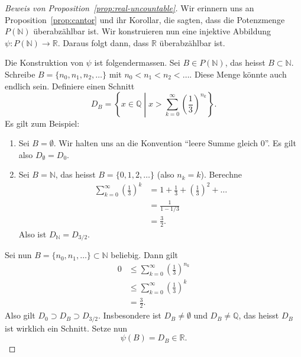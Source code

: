 \documentclass[../main.tex]{subfiles}
\begin{document}
\begin{proof}[Beweis von Proposition~\ref{prop:real-uncountable}]
  Wir erinnern uns an Proposition~\ref{prop:cantor} und ihr Korollar,
  die sagten, dass die Potenzmenge $P(\mathbb N )$ überabzählbar ist.
  Wir konstruieren nun eine injektive Abbildung
  $\psi \colon P(\mathbb N) \to \mathbb R$.
  Daraus folgt dann, dass $\mathbb R$ überabzählbar ist.

  Die Konstruktion von $\psi$ ist folgendermassen.
  Sei $B \in P(\mathbb N)$, das heisst $B \subset \mathbb N$.
  Schreibe $B = \{n_{0}, n_{1}, n_{2}, \dots\}$ mit $n_{0} < n_{1} < n_{2} < \dots$.
  Diese Menge könnte auch endlich sein.
  Definiere einen Schnitt
  \[
    D_{B} = \left\{x \in \mathbb Q \middle| x > \sum_{k=0}^{\infty}
      {\left( \frac{1}{3}\right)}^{n_{k}}
    \right\}.
  \]
  Es gilt zum Beispiel:
  \begin{enumerate}[(1)]
    \item Sei $B = \emptyset$.
      Wir halten uns an die Konvention ``leere Summe gleich $0$''. Es gilt also
      $D_{\emptyset} = D_{0}$.
    \item Sei $B = \mathbb N$, das heisst $B = \{0, 1, 2, \dots\}$
      (also $n_{k} = k$). Berechne
      \begin{align*}
        \sum_{k=0}^{\infty}
        {\left(\frac{1}{3}\right)}^{k}
        &= 1 + \frac{1}{3} + {\left(\frac{1}{3}\right)}^{2} + \dots \\
        &= \frac{1}{1 - 1/3}
          \\ &= \frac{3}{2}.
      \end{align*}
      Also ist $D_{\mathbb N} = D_{3/2}$.
  \end{enumerate}

Sei nun $B = \{n_{0}, n_{1}, \dots \} \subset \mathbb N$ beliebig.
Dann gilt
\begin{align*}
  0
  &\leq \sum_{k=0}^{\infty}{\left(\frac{1}{3}\right)}^{n_{k}} \\
  &\leq \sum_{k=0}^{\infty} {\left(\frac{1}{3}\right)}^{k} \\
  &= \frac{3}{2}.
\end{align*}
Also gilt $D_{0} \supset D_{B} \supset D_{3/2}$.
Insbesondere ist $D_{B} \neq \emptyset$ und $D_{B} \neq \mathbb Q$, das heisst
$D_{B}$ ist wirklich ein Schnitt.
Setze nun
\[\psi(B) = D_{B} \in \mathbb R.\]


\end{proof}
\end{document}
